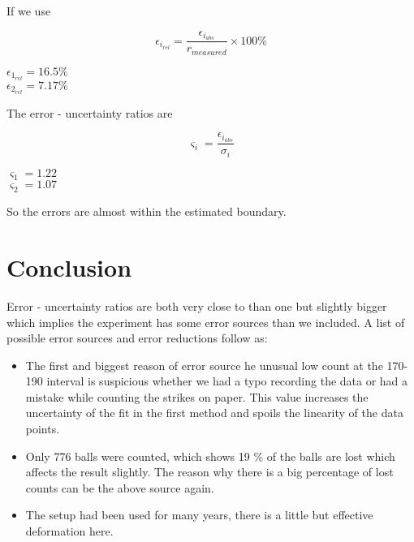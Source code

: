 \documentclass[a4paper]{article}
\begin{document}
\begin{multicols}{2}
If we use

\begin{equation}
\epsilon_{i_{rel}} = \dfrac{\epsilon_{i_{abs}}}{r_{measured}} \times 100 \%
\end{equation}

\begin{center}

$\epsilon_{1_{rel}} = 16.5 \% $ \\
$\epsilon_{2_{rel}} = 7.17 \% $

\end{center}

The error - uncertainty ratios are

\begin{equation}
\varsigma_i = \dfrac{\epsilon_{i_{abs}}}{\sigma_i}
\end{equation}

\begin{center}
$\varsigma_1 = 1.22$ \\
$\varsigma_2 = 1.07$\\
\end{center}

So the errors are almost within the estimated boundary.

\section{Conclusion}

Error - uncertainty ratios are both very close to than one but slightly bigger which implies the experiment has some error sources than we included. A list of possible error sources and error reductions follow as:

\begin{itemize}

\item The first and biggest reason of error source he unusual low count at the 170-190 \textdegree interval is suspicious whether we had a typo recording the data or had a mistake while counting the strikes on paper. This value increases the uncertainty of the fit in the first method and spoils the linearity of the data points.

\item Only 776 balls were counted, which shows 19 \% of the balls are lost which affects the result slightly. The reason why there is a big percentage of lost counts can be the above source again.

\item The setup had been used for many years, there is a little but effective deformation here. 


\end{itemize}
\end{multicols}
\end{document}
